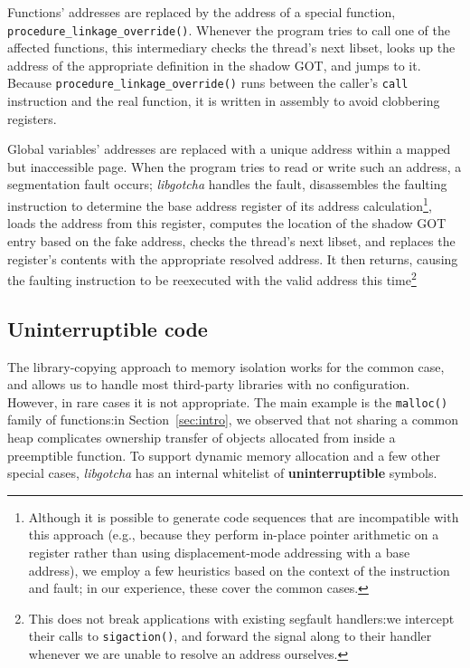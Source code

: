 Functions' addresses are replaced by the address of a special function,
\texttt{procedure\_linkage\_override()}.  Whenever the program tries to call one of
the affected functions, this intermediary checks the thread's next libset, looks up
the address of the appropriate definition in the shadow GOT, and jumps to it.
Because \texttt{procedure\_linkage\_override()} runs between the caller's
\texttt{call} instruction and the real function, it is written in assembly to avoid
clobbering registers.


Global variables' addresses are replaced with a unique address within a mapped but
inaccessible page.  When the program tries to read or write such an address, a
segmentation fault occurs; \textit{libgotcha} handles the fault, disassembles the
faulting instruction to determine the base address register of its address
calculation\footnote{Although it is possible to
generate code sequences that are incompatible with this approach (e.g., because they
perform in-place pointer arithmetic on a register rather than using displacement-mode
addressing with a base address), we employ a few heuristics based on the context of
the instruction and fault; in our experience, these cover the common cases.},
loads the address from this register, computes the location of the
shadow GOT entry based on the fake address, checks the thread's next libset, and
replaces the register's contents with the appropriate resolved address.  It then
returns, causing the faulting instruction to be reexecuted with the valid address
this time\footnote{This does not break applications with existing segfault
handlers:\@ we intercept their calls to \texttt{sigaction()}, and forward the signal
along to their handler whenever we are unable to resolve an address ourselves.}



\subsection{Uninterruptible code}

The library-copying approach to memory isolation works for the common case, and
allows us to handle most third-party libraries with no configuration.  However, in
rare cases it is not appropriate.  The main example is the \texttt{malloc()} family
of functions:\@ in Section~\ref{sec:intro}, we observed that not sharing a common
heap complicates ownership transfer of objects allocated from inside a preemptible
function.  To support dynamic memory allocation and a few other special cases,
\textit{libgotcha} has an internal whitelist of \textbf{uninterruptible} symbols.


